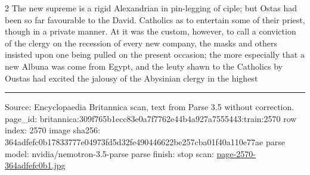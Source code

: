 \documentclass[10pt]{article}
\begin{document}
\begin{multicols}{2}
The new supreme is a rigid Alexandrian in pin-legging of ciple; but Ostas had been so far favourable to the David. Catholics as to entertain some of their priest, though in a private manner. At it was the custom, however, to call a conviction of the clergy on the recession of every new company, the masks and others insisted upon one being pulled on the present occasion; the more especially that a new Albuna was come from Egypt, and the leuty shawn to the Catholics by Oustas had excited the jalousy of the Abysinian clergy in the highest

\end{multicols}
\vfill\par\noindent\rule{\linewidth}{0.4pt}\par
{\scriptsize\color{gray}\noindent Source: Encyclopaedia Britannica scan, text from Parse 3.5 without correction. page\_id: britannica:309f765b1ecc83e0a7f7762e44b4a927a7555443:train:2570 \quad row index: 2570 \quad image sha256: 364adfefc0b17833777e04973fd5d32fe490446622be257cba01f40a110e77ae \quad parse model: nvidia/nemotron-3.5-parse \quad parse finish: stop \quad scan: \href{../scans/page-2570-364adfefc0b1.jpg}{page-2570-364adfefc0b1.jpg}\par}
\end{document}
